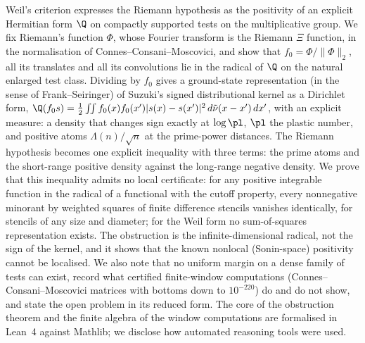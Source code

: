 Weil's criterion expresses the Riemann hypothesis as the positivity of an explicit Hermitian form $\Q$ on compactly supported
tests on the multiplicative group. We fix Riemann's function $\Phi$, whose Fourier transform is the Riemann $\Xi$ function, in the normalisation of
Connes--Consani--Moscovici, and show that $f_0=\Phi/\|\Phi\|_2$, all its translates and all its convolutions lie in the radical of
$\Q$ on the natural enlarged test class. Dividing by $f_0$ gives a ground-state representation (in the sense of Frank--Seiringer) of Suzuki's
signed distributional kernel as a Dirichlet form, $\Q(f_0s)=\tfrac12\iint f_0(x)f_0(x')|s(x)-s(x')|^2\,d\tilde\nu(x-x')\,dx'$, with an explicit
measure: a density that changes sign exactly at $\log\pl$, $\pl$ the plastic number, and positive atoms $\Lambda(n)/\sqrt n$ at the prime-power
distances. The Riemann hypothesis becomes one explicit inequality with three terms: the prime atoms and the short-range positive density against
the long-range negative density. We prove that this inequality admits no local certificate: for any positive integrable function in the radical
of a functional with the cutoff property, every nonnegative minorant by weighted squares of finite difference stencils vanishes identically,
for stencils of any size and diameter; for the Weil form no sum-of-squares representation exists. The obstruction is the infinite-dimensional
radical, not the sign of the kernel, and it shows that the known nonlocal (Sonin-space) positivity cannot be localised. We also note that no
uniform margin on a dense family of tests can exist, record what certified finite-window computations (Connes--Consani--Moscovici matrices
with bottoms down to $10^{-220}$) do and do not show, and state the open problem in its reduced form. The core of the obstruction theorem and the
finite algebra of the window computations are formalised in Lean~4 against Mathlib; we disclose how automated reasoning tools were used.